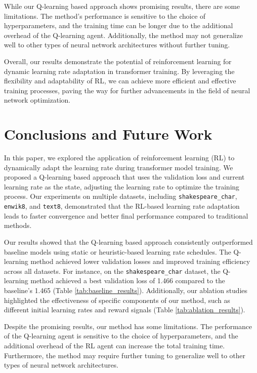 \documentclass{article} %
\begin{document}
While our Q-learning based approach shows promising results, there are some limitations. The method's performance is sensitive to the choice of hyperparameters, and the training time can be longer due to the additional overhead of the Q-learning agent. Additionally, the method may not generalize well to other types of neural network architectures without further tuning.

Overall, our results demonstrate the potential of reinforcement learning for dynamic learning rate adaptation in transformer training. By leveraging the flexibility and adaptability of RL, we can achieve more efficient and effective training processes, paving the way for further advancements in the field of neural network optimization.

\section{Conclusions and Future Work}
\label{sec:conclusion}

In this paper, we explored the application of reinforcement learning (RL) to dynamically adapt the learning rate during transformer model training. We proposed a Q-learning based approach that uses the validation loss and current learning rate as the state, adjusting the learning rate to optimize the training process. Our experiments on multiple datasets, including \texttt{shakespeare\_char}, \texttt{enwik8}, and \texttt{text8}, demonstrated that the RL-based learning rate adaptation leads to faster convergence and better final performance compared to traditional methods.

Our results showed that the Q-learning based approach consistently outperformed baseline models using static or heuristic-based learning rate schedules. The Q-learning method achieved lower validation losses and improved training efficiency across all datasets. For instance, on the \texttt{shakespeare\_char} dataset, the Q-learning method achieved a best validation loss of 1.466 compared to the baseline's 1.465 (Table \ref{tab:baseline_results}). Additionally, our ablation studies highlighted the effectiveness of specific components of our method, such as different initial learning rates and reward signals (Table \ref{tab:ablation_results}).

Despite the promising results, our method has some limitations. The performance of the Q-learning agent is sensitive to the choice of hyperparameters, and the additional overhead of the RL agent can increase the total training time. Furthermore, the method may require further tuning to generalize well to other types of neural network architectures.
\end{document}
